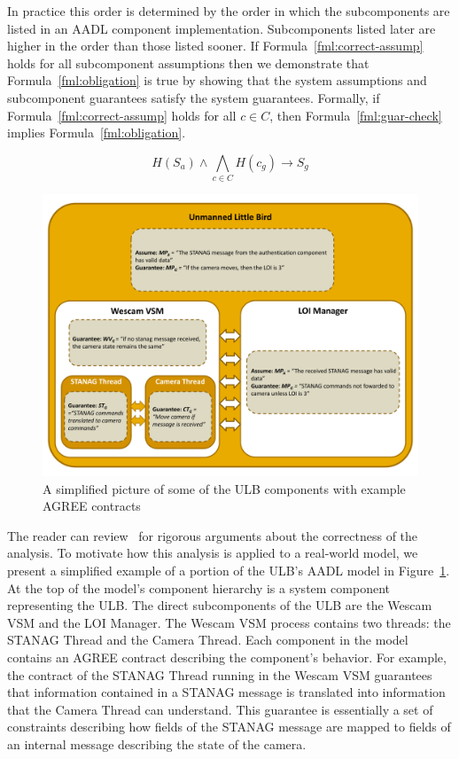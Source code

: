 \documentclass{llncs}
\begin{document}
In practice this order is determined by the order in which the subcomponents are listed in an AADL component implementation.  Subcomponents listed later are higher in the order than those listed sooner. If Formula~\ref{fml:correct-assump} holds for all subcomponent assumptions then we demonstrate that Formula~\ref{fml:obligation} is true by showing that the system assumptions and subcomponent guarantees satisfy the system guarantees.  Formally, if Formula~\ref{fml:correct-assump} holds for all $c \in C$, then Formula~\ref{fml:guar-check} implies Formula~\ref{fml:obligation}. 

\begin{center}
\begin{equation}\label{fml:guar-check}
 H(S_a) \wedge \bigwedge_{c \in C} H(c_g) \rightarrow S_g 
\end{equation}
\end{center}

\begin{figure}
\begin{center}
\includegraphics[scale=0.5]{camera_prop.pdf}
\end{center}
\caption{A simplified picture of some of the ULB components with example AGREE contracts}
\label{fig:agree-arch}
\end{figure}

The reader can review~\cite{agree} for rigorous arguments about the correctness of the analysis. To motivate how this analysis is applied to a real-world model, we present a simplified example of a portion of the ULB's AADL model in Figure~\ref{fig:agree-arch}.  At the top of the model's component hierarchy is a system component representing the ULB.  The direct subcomponents of the ULB are the Wescam VSM and the LOI Manager.  The Wescam VSM process contains two threads: the STANAG Thread and the Camera Thread. Each component in the model contains an AGREE contract describing the component's behavior.  For example, the contract of the STANAG Thread running in the Wescam VSM guarantees that information contained in a STANAG message is translated into information that the Camera Thread can understand.  This guarantee is essentially a set of constraints describing how fields of the STANAG message are mapped to fields of an internal message describing the state of the camera.
\end{document}
